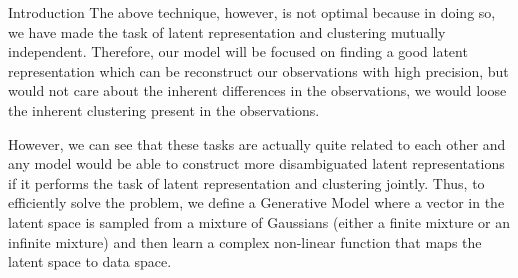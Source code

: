 \documentclass{article}
\begin{document}
\begin{psection}{Introduction}
	The above technique, however, is not optimal because in doing so, we have made the task of latent representation and clustering mutually independent. Therefore, our model will be focused on finding a good latent representation which can be reconstruct our observations with high precision, but would not care about the inherent differences in the observations, \ie we would loose the inherent clustering present in the observations.

	However, we can see that these tasks are actually quite related to each other and any model would be able to construct more disambiguated latent representations if it performs the task of latent representation and clustering jointly. Thus, to efficiently solve the problem, we define a Generative Model where a vector in the latent space is sampled from a mixture of Gaussians (either a finite mixture or an infinite mixture) and then learn a complex non-linear function that maps the latent space to data space.

\end{psection}
\end{document}
